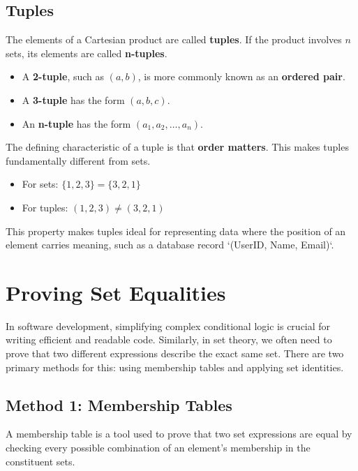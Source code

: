 \subsection*{Tuples}
The elements of a Cartesian product are called \textbf{tuples}. If the product involves $n$ sets, its elements are called \textbf{n-tuples}.

\begin{itemize}
    \item A \textbf{2-tuple}, such as $(a, b)$, is more commonly known as an \textbf{ordered pair}.
    \item A \textbf{3-tuple} has the form $(a, b, c)$.
    \item An \textbf{n-tuple} has the form $(a_1, a_2, \dots, a_n)$.
\end{itemize}

The defining characteristic of a tuple is that \textbf{order matters}. This makes tuples fundamentally different from sets.
\begin{itemize}
    \item For sets: $\{1, 2, 3\} = \{3, 2, 1\}$
    \item For tuples: $(1, 2, 3) \neq (3, 2, 1)$
\end{itemize}
This property makes tuples ideal for representing data where the position of an element carries meaning, such as a database record `(UserID, Name, Email)`.

\section{Proving Set Equalities}
In software development, simplifying complex conditional logic is crucial for writing efficient and readable code. Similarly, in set theory, we often need to prove that two different expressions describe the exact same set. There are two primary methods for this: using membership tables and applying set identities.

\subsection*{Method 1: Membership Tables}
A membership table is a tool used to prove that two set expressions are equal by checking every possible combination of an element's membership in the constituent sets.


